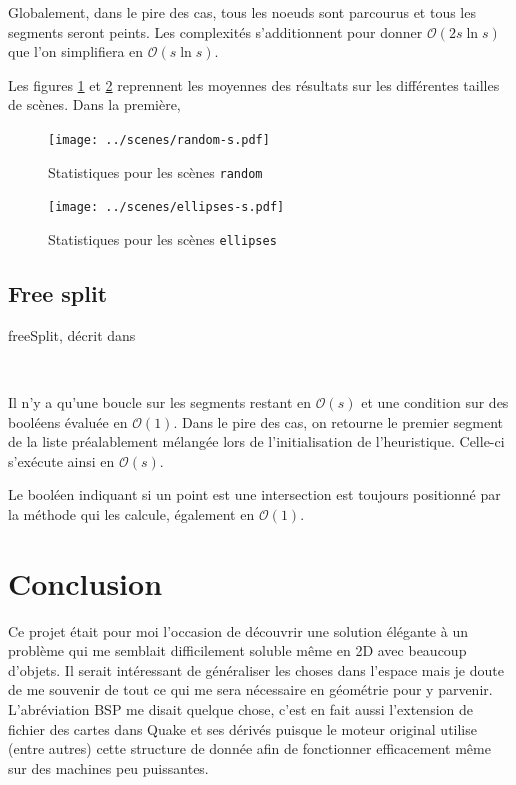\documentclass[12pt,twocolumn]{article}
\newcommand{\bigO}{\mathcal{O}}
\newcommand{\es}{\emptyset}
\begin{document}
Globalement, dans le pire des cas, tous les noeuds sont parcourus et
tous les segments seront peints. Les complexités s'additionnent pour donner
$\bigO(2s\ln s)$ que l'on simplifiera en $\bigO(s\ln s)$.


Les figures \ref{fig:rS} et \ref{fig:eS} reprennent les moyennes des résultats
sur les différentes tailles de scènes. Dans la première,

\begin{figure}[p]
\center
\texttt{[image: ../scenes/random-s.pdf]}
\caption{Statistiques pour les scènes \texttt{random}}\label{fig:rS}
\end{figure}

\begin{figure}[p]
\center
\texttt{[image: ../scenes/ellipses-s.pdf]}
\caption{Statistiques pour les scènes \texttt{ellipses}}\label{fig:eS}
\end{figure}


\subsection{Free split}
\begin{algorithm}
\caption{freeSplit, décrit dans \cite[p.~257]{cg}}
\SetAlgoLined\DontPrintSemicolon
\KwData{$r \neq \es$}
 {
	 {
	}
}
 
~
\end{algorithm}

Il n'y a qu'une boucle sur les segments restant en $\bigO(s)$ et
une condition sur des booléens évaluée en $\bigO(1)$.
Dans le pire des cas, on retourne le premier segment de la liste
préalablement mélangée lors de l'initialisation de l'heuristique.
Celle-ci s'exécute ainsi en $\bigO(s)$.

Le booléen indiquant si un point est une intersection est toujours
positionné par la méthode qui les calcule, également en $\bigO(1)$.


\section{Conclusion}
Ce projet était pour moi l'occasion de découvrir une solution élégante à un
problème qui me semblait difficilement soluble même en 2D avec beaucoup d'objets.
Il serait intéressant de généraliser les choses dans l'espace mais je doute
de me souvenir de tout ce qui me sera nécessaire en géométrie pour y parvenir.
L'abréviation BSP me disait quelque chose, c'est en fait aussi l'extension de
fichier des cartes dans Quake et ses dérivés puisque le moteur original utilise
(entre autres) cette structure de donnée afin de fonctionner efficacement
même sur des machines peu puissantes.
\end{document}
